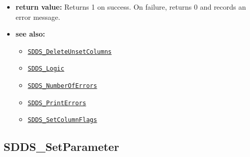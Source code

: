 \documentclass[11pt]{article}
\newcommand{\progref}[1]{\hyperref[SDDS_#1]{\tt SDDS\_#1}}
\begin{document}
\begin{itemize}
\begin{itemize}
\begin{itemize}
\item SDDS\_MATCH\_STRING - SDDS\_SetColumnsOfInterest(SDDS\_TABLE *SDDS\_table, SDDS\_MATCH\_STRING, char *string, int32\_t logic\_mode), where string is a wildcard-containing, NULL-terminated character string to which column names will be matched. The columns so matched are added to the list of columns deemed to be ``of interest'' by the caller. The order in which the caller gives the column names is recorded, and calls to SDDS\_GetRow and SDDS\_GetMatrixOfRows return the columns in this order. See the manual page for SDDS\_Logic for a discussion of the logic\_mode parameter. 
\end{itemize}
\end{itemize}
\item {\bf return value:}\newline
Returns 1 on success. On failure, returns 0 and records an error message.
\item {\bf see also:}
\begin{itemize}
\item \progref{DeleteUnsetColumns}
\item \progref{Logic}
\item \progref{NumberOfErrors}
\item \progref{PrintErrors}
\item \progref{SetColumnFlags}
\end{itemize}
\end{itemize}

\subsection{SDDS\_SetParameter}
\label{SDDS_SetParameter}
\end{document}
